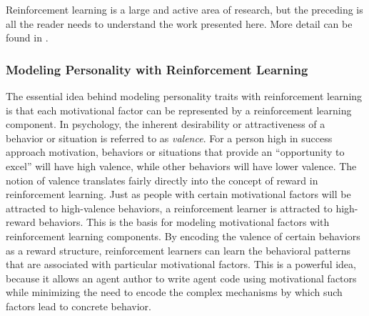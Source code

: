 

Reinforcement learning is a large and active area of research, but the preceding is all the reader needs to understand the work presented here.  More detail can be found in \cite{sutton1998reinforcement,kaelbling1996reinforcement}.


\subsubsection{Modeling Personality with Reinforcement Learning}

The essential idea behind modeling personality traits with reinforcement learning is that each motivational factor can be represented by a reinforcement learning component.  In psychology, the inherent desirability or attractiveness of a behavior or situation is referred to as {\em valence}.  For a person high in success approach motivation, behaviors or situations that provide an ``opportunity to excel'' will have high valence, while other behaviors will have lower valence.  The notion of valence translates fairly directly into the concept of reward in reinforcement learning.  Just as people with certain motivational factors will be attracted to high-valence behaviors, a reinforcement learner is attracted to high-reward behaviors.  This is the basis for modeling motivational factors with reinforcement learning components.  By encoding the valence of certain behaviors as a reward structure, reinforcement learners can learn the behavioral patterns that are associated with particular motivational factors.  This is a powerful idea, because it allows an agent author to write agent code using motivational factors while minimizing the need to encode the complex mechanisms by which such factors lead to concrete behavior.

